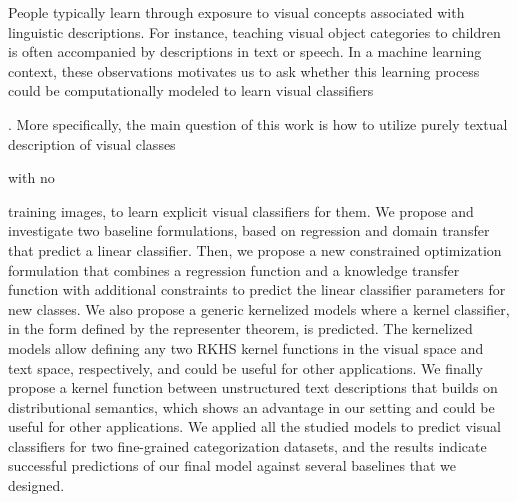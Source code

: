 People typically learn through exposure to visual concepts associated with linguistic descriptions. For instance, teaching visual object categories to children is often accompanied by descriptions in text or speech. In a machine learning context, these observations motivates us to ask whether this learning process could be computationally modeled to learn visual classifiers. More specifically, the main question of this work is how to utilize purely textual description of visual classes with no training images, to learn explicit visual classifiers for them. We propose and investigate two baseline formulations, based on regression and domain transfer that predict a linear classifier. Then, we propose a new constrained optimization formulation that combines a regression function and a knowledge transfer function with additional constraints to predict the linear classifier parameters for new classes. We also propose a generic kernelized  models where a kernel classifier, in the form defined by the representer  theorem, is predicted. The kernelized models allow defining any two RKHS kernel functions in the visual space and text space, respectively, and could be useful for other applications. We finally propose a kernel function between unstructured text descriptions that builds on distributional semantics, which shows an advantage in our  setting  and could be useful for other applications. We applied all the studied models to predict visual classifiers for two fine-grained categorization datasets, and the results indicate successful predictions of our final model against  several baselines that we designed.  


